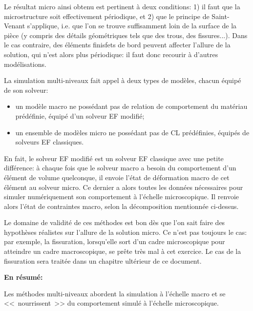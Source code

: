 Le résultat micro ainsi obtenu est pertinent à deux conditions:
1) il faut que la microstructure soit effectivement périodique, et 2) que le principe de
Saint-Venant
s'applique, i.e. que l'on se trouve suffisamment loin de la surface de la pièce
(y compris des détails géométriques tels que des trous, des fissures...).
Dans le cas contraire, des éléments finisfets de bord peuvent affecter l'allure de la solution, qui n'est
alors plus périodique: il faut donc recourir à d'autres modélisations.

\medskip
La simulation multi-niveaux fait appel à deux types de modèles, chacun équipé de son solveur:
\begin{itemize}
  \item un modèle macro ne possédant pas de relation de comportement du matériau
	prédéfinie, équipé d'un solveur EF modifié;
  \item un ensemble de modèles micro ne possédant pas de CL prédéfinies,
	équipés de solveurs EF classiques.
\end{itemize}

En fait, le solveur EF modifié est un solveur EF classique avec une petite différence:
à chaque fois que le solveur macro a besoin du comportement d'un élément de volume
quelconque, il envoie l'état de déformation macro de cet élément au solveur micro.
Ce dernier a alors toutes les données nécessaires pour simuler numériquement son comportement
à l'échelle microscopique. Il renvoie alors l'état de contraintes macro, selon la décomposition
mentionnée ci-dessus.

Le domaine de validité de ces méthodes est bon dès que l'on sait faire des hypothèses
réalistes sur l'allure de la solution micro. Ce n'est pas toujours le cas: par exemple, la fissuration,
lorsqu'elle sort d'un cadre microscopique pour atteindre un cadre macroscopique, se prête
très mal à cet exercice.
Le cas de la fissuration sera traitée dans un chapitre ultérieur de ce document.

\medskip{}
\textbf{En résumé:}

Les méthodes multi-niveaux abordent la simulation à l'échelle macro
et se <<~nourrissent~>> du comportement simulé à l'échelle microscopique.

